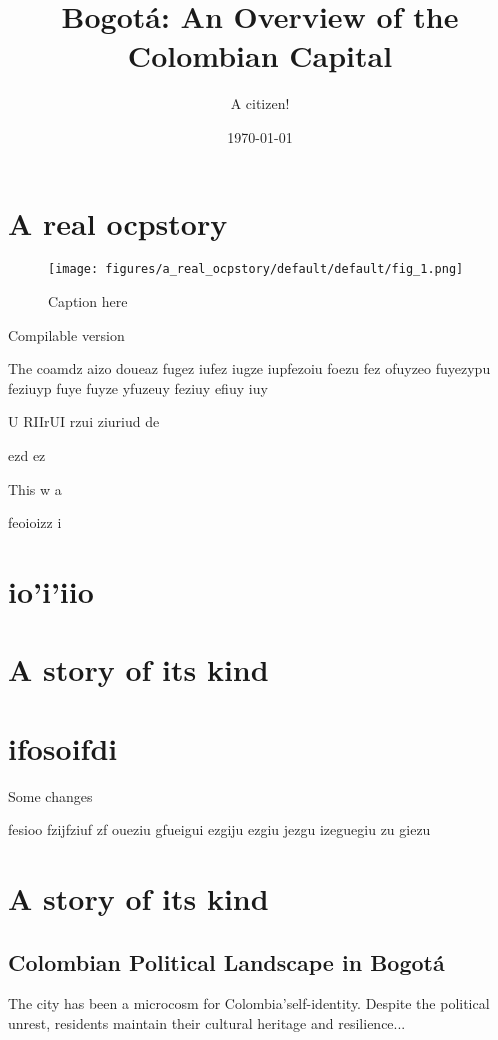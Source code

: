 \documentclass{article}
\title{Bogotá: An Overview of the Colombian Capital}
\author{A citizen!}
\date{\today}
\begin{document}
\maketitle

\section{A real ocpstory}


\begin{figure}[h!]
    \centering
    \texttt{[image: figures/a\_real\_ocpstory/default/default/fig\_1.png]}
    \caption{Caption here}
    \label{fig:a_real_ocpstory_default_1}
\end{figure}

Compilable version

The coamdz aizo doueaz fugez iufez iugze iupfezoiu foezu fez ofuyzeo fuyezypu feziuyp fuye fuyze yfuzeuy feziuy efiuy iuy

U RIIrUI rzui ziuriud
de

ezd
ez



This w
a

feoioizz
i
\section{io'i'iio}

\section{A story of its kind}

\section{ifosoifdi}

Some changes


fesioo
fzijfziuf
zf
oueziu
gfueigui
ezgiju
ezgiu
jezgu
izeguegiu
zu
giezu


\section{A story of its kind} \subsection{Colombian Political Landscape in Bogotá} The city has been a microcosm for Colombia’self-identity. Despite the political unrest, residents maintain their cultural heritage and resilience...
\end{document}
